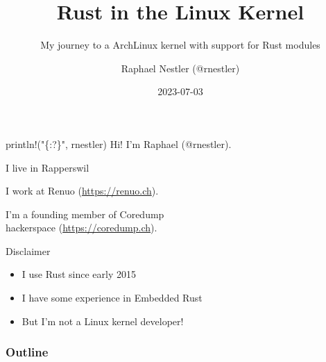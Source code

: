 \documentclass[aspectratio=1610,14pt,t]{beamer}
\title{Rust in the Linux Kernel}
\subtitle{My journey to a ArchLinux kernel with support for Rust modules}
\date{2023-07-03}
\author{Raphael Nestler (@rnestler)}
\institute{Rust Zürichsee Meetup}
\begin{document}
\pagecolor{almostwhite}  %
\maketitle


\begin{frame}[c]{println!("\{:?\}", rnestler)}
  Hi! I'm Raphael (@rnestler).

  \pause I live in Rapperswil

  \pause I work at Renuo ({\small \url{https://renuo.ch}}).

  \pause I'm a founding member of Coredump\\hackerspace ({\small \url{https://coredump.ch}}).
\end{frame}

\begin{frame}[c]{Disclaimer}
  \begin{itemize}
    \item I use Rust since early 2015
    \item I have some experience in Embedded Rust
    \item But I'm not a Linux kernel developer!
  \end{itemize}
\end{frame}


\begin{frame}
  \frametitle{Outline}
  \setcounter{tocdepth}{1}
  \tableofcontents
\end{frame}











\end{document}
